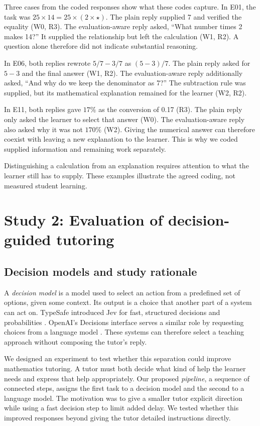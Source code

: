 \documentclass[10pt,a4paper]{article}
\begin{document}
Three cases from the coded responses show what these codes capture. In E01, the task was $25\times14=25\times(2\times\star)$. The plain reply supplied 7 and verified the equality (W0, R3). The evaluation-aware reply asked, \enquote{What number times 2 makes 14?} It supplied the relationship but left the calculation (W1, R2). A question alone therefore did not indicate substantial reasoning.

In E06, both replies rewrote $5/7-3/7$ as $(5-3)/7$. The plain reply asked for $5-3$ and the final answer (W1, R2). The evaluation-aware reply additionally asked, \enquote{And why do we keep the denominator as 7?} The subtraction rule was supplied, but its mathematical explanation remained for the learner (W2, R2).

In E11, both replies gave $17\%$ as the conversion of 0.17 (R3). The plain reply only asked the learner to select that answer (W0). The evaluation-aware reply also asked why it was not $170\%$ (W2). Giving the numerical answer can therefore coexist with leaving a new explanation to the learner. This is why we coded supplied information and remaining work separately.

Distinguishing a calculation from an explanation requires attention to what the learner still has to supply. These examples illustrate the agreed coding, not measured student learning.

\section{Study 2: Evaluation of decision-guided tutoring}
\subsection{Decision models and study rationale}
A \emph{decision model} is a model used to select an action from a predefined set of options, given some context. Its output is a choice that another part of a system can act on. TypeSafe introduced Jev for fast, structured decisions and probabilities \citep{almeida2026jev}. OpenAI's Decisions interface serves a similar role by requesting choices from a language model \citep{openai2026decisions}. These systems can therefore select a teaching approach without composing the tutor's reply.

We designed an experiment to test whether this separation could improve mathematics tutoring. A tutor must both decide what kind of help the learner needs and express that help appropriately. Our proposed \emph{pipeline}, a sequence of connected steps, assigns the first task to a decision model and the second to a language model. The motivation was to give a smaller tutor explicit direction while using a fast decision step to limit added delay. We tested whether this improved responses beyond giving the tutor detailed instructions directly.
\end{document}
